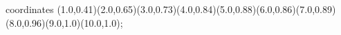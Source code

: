 					coordinates { (1.0,0.41)(2.0,0.65)(3.0,0.73)(4.0,0.84)(5.0,0.88)(6.0,0.86)(7.0,0.89)(8.0,0.96)(9.0,1.0)(10.0,1.0)};